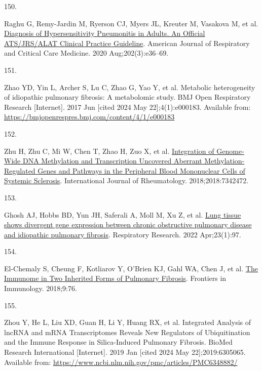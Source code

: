 \documentclass[
]{article}
\newlength{\cslhangindent}
\newlength{\csllabelwidth}
\newenvironment{CSLReferences}[2] %
 {\begin{list}{}{%
  \setlength{\itemindent}{0pt}
  \setlength{\leftmargin}{0pt}
  \setlength{\parsep}{0pt}
  \ifodd #1
   \setlength{\leftmargin}{\cslhangindent}
   \setlength{\itemindent}{-1\cslhangindent}
  \fi
  \setlength{\itemsep}{#2\baselineskip}}}
 {\end{list}}
\newcommand{\CSLLeftMargin}[1]{\parbox[t]{\csllabelwidth}{\strut#1\strut}}
\newcommand{\CSLRightInline}[1]{\parbox[t]{\linewidth - \csllabelwidth}{\strut#1\strut}}
\begin{document}
\begin{CSLReferences}{0}{1}
\CSLLeftMargin{150. }%
\CSLRightInline{Raghu G, Remy-Jardin M, Ryerson CJ, Myers JL, Kreuter M, Vasakova M, et al. \href{https://doi.org/10.1164/rccm.202005-2032ST}{Diagnosis of {Hypersensitivity} {Pneumonitis} in {Adults}. {An} {Official} {ATS}/{JRS}/{ALAT} {Clinical} {Practice} {Guideline}}. American Journal of Respiratory and Critical Care Medicine. 2020 Aug;202(3):e36--69. }

\CSLLeftMargin{151. }%
\CSLRightInline{Zhao YD, Yin L, Archer S, Lu C, Zhao G, Yao Y, et al. Metabolic heterogeneity of idiopathic pulmonary fibrosis: A metabolomic study. BMJ Open Respiratory Research {[}Internet{]}. 2017 Jun {[}cited 2024 May 22{]};4(1):e000183. Available from: \url{https://bmjopenrespres.bmj.com/content/4/1/e000183}}

\CSLLeftMargin{152. }%
\CSLRightInline{Zhu H, Zhu C, Mi W, Chen T, Zhao H, Zuo X, et al. \href{https://doi.org/10.1155/2018/7342472}{Integration of {Genome}-{Wide} {DNA} {Methylation} and {Transcription} {Uncovered} {Aberrant} {Methylation}-{Regulated} {Genes} and {Pathways} in the {Peripheral} {Blood} {Mononuclear} {Cells} of {Systemic} {Sclerosis}}. International Journal of Rheumatology. 2018;2018:7342472. }

\CSLLeftMargin{153. }%
\CSLRightInline{Ghosh AJ, Hobbs BD, Yun JH, Saferali A, Moll M, Xu Z, et al. \href{https://doi.org/10.1186/s12931-022-02013-w}{Lung tissue shows divergent gene expression between chronic obstructive pulmonary disease and idiopathic pulmonary fibrosis}. Respiratory Research. 2022 Apr;23(1):97. }

\CSLLeftMargin{154. }%
\CSLRightInline{El-Chemaly S, Cheung F, Kotliarov Y, O'Brien KJ, Gahl WA, Chen J, et al. \href{https://doi.org/10.3389/fimmu.2018.00076}{The {Immunome} in {Two} {Inherited} {Forms} of {Pulmonary} {Fibrosis}}. Frontiers in Immunology. 2018;9:76. }

\CSLLeftMargin{155. }%
\CSLRightInline{Zhou Y, He L, Liu XD, Guan H, Li Y, Huang RX, et al. Integrated {Analysis} of {lncRNA} and {mRNA} {Transcriptomes} {Reveals} {New} {Regulators} of {Ubiquitination} and the {Immune} {Response} in {Silica}-{Induced} {Pulmonary} {Fibrosis}. BioMed Research International {[}Internet{]}. 2019 Jan {[}cited 2024 May 22{]};2019:6305065. Available from: \url{https://www.ncbi.nlm.nih.gov/pmc/articles/PMC6348882/}}


\end{CSLReferences}
\end{document}
